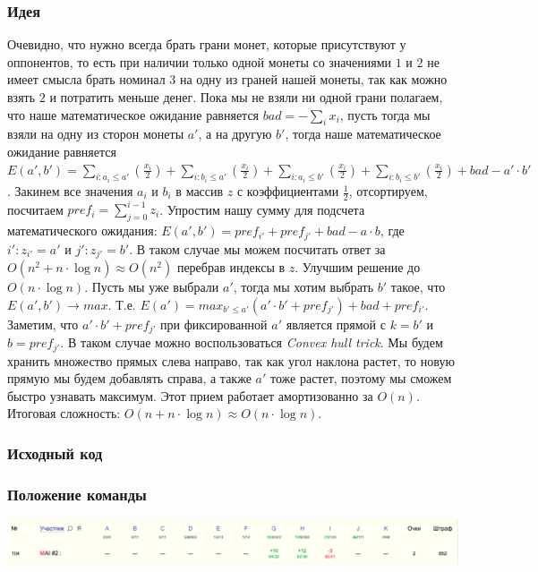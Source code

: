 \documentclass[12pt]{article}
\begin{document}
\subsubsection*{Идея}
Очевидно, что нужно всегда брать грани монет, которые присутствуют у оппонентов, то есть при наличии только одной монеты со значениями $1$ и $2$ не имеет смысла брать номинал $3$ на одну из граней нашей монеты, так как можно взять $2$ и потратить меньше денег. Пока мы не взяли ни одной грани полагаем, что наше математическое ожидание равняется $bad = -\sum_{i}x_i$, пусть тогда мы взяли на одну из сторон монеты $a'$, а на другую $b'$, тогда наше математическое ожидание равняется $E(a',b') = \sum_{i : a_i \leqslant a'}(\frac{x_i}{2}) + \sum_{i : b_i \leqslant a'}(\frac{x_i}{2}) + \sum_{i : a_i \leqslant b'}(\frac{x_i}{2}) + \sum_{i : b_i \leqslant b'}(\frac{x_i}{2}) + bad - a' \cdot b'$. Закинем все значения $a_i$ и $b_i$ в массив $z$ с коэффициентами $\frac{1}{2}$, отсортируем, посчитаем $pref_i = \sum_{j = 0}^{i - 1}z_i$. Упростим нашу сумму для подсчета математического ожидания: $E(a',b') = pref_{i'} + pref_{j'} + bad - a \cdot b$, где $i' : z_{i'} = a'$ и $j' : z_{j'} = b'$. В таком случае мы можем посчитать ответ за $O(n ^ 2 + n \cdot \log{n}) \approx O(n ^ 2)$ перебрав индексы в $z$. Улучшим решение до $O(n \cdot \log{n})$. Пусть мы уже выбрали $a'$, тогда мы хотим выбрать $b'$ такое, что $E(a', b') \rightarrow max$. Т.е. $E(a') = max_{b' \leqslant a'}(a'\cdot b' + pref_{j'}) + bad + pref_{i'}$. Заметим, что $a'\cdot b' + pref_{j'}$ при фиксированной $a'$ является прямой с $k = b'$ и $b = pref_{j'}$. В таком случае можно воспользоваться \textit{Convex hull trick}. Мы будем хранить множество прямых слева направо, так как угол наклона растет, то новую прямую мы будем добавлять справа, а также $a'$ тоже растет, поэтому мы сможем быстро узнавать максимум. Этот прием работает амортизованно за $O(n)$. Итоговая сложность: $O(n + n \cdot \log{n}) \approx O(n \cdot \log{n})$.
\subsubsection*{Исходный код}

\subsubsection*{Положение команды}
\includegraphics[scale=0.25]{images/gp_dolgop.png}\newline\noindent
\pagebreak
\end{document}
